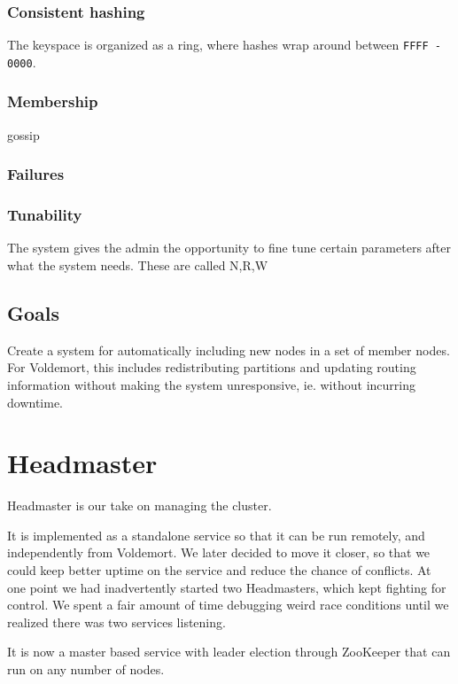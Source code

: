 \subsubsection{Consistent hashing}
The keyspace is organized as a ring, where hashes wrap around between \texttt{FFFF - 0000}.

\subsubsection{Membership}
gossip

\subsubsection{Failures}

\subsubsection{Tunability}
The system gives the admin the opportunity to fine tune certain parameters after what the system needs.
These are called N,R,W

\subsection{Goals}
Create a system for automatically including new nodes in a set of member nodes.
For Voldemort, this includes redistributing partitions and updating routing information without making the system unresponsive, ie. without incurring downtime.

\subsection{}

\section{Headmaster}
Headmaster is our take on managing the cluster.

It is implemented as a standalone service so that it can be run remotely, and independently from Voldemort.
We later decided to move it closer, so that we could keep better uptime on the service and reduce the chance of conflicts.
At one point we had inadvertently started two Headmasters, which kept fighting for control.
We spent a fair amount of time debugging weird race conditions until we realized there was two services listening.

It is now a master based service with leader election through ZooKeeper that can run on any number of nodes.

\section{}
